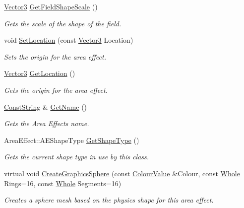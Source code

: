 \begin{DoxyCompactItemize}
\hyperlink{classphys_1_1Vector3}{Vector3} \hyperlink{classphys_1_1AreaEffect_a251d82e373c6ada5b80c023434e513f6}{GetFieldShapeScale} ()
\begin{DoxyCompactList}\small\item\em Gets the scale of the shape of the field. \item\end{DoxyCompactList}\item 
void \hyperlink{classphys_1_1AreaEffect_a9332d4f1c5d1eaa23c6db5e9b95d746e}{SetLocation} (const \hyperlink{classphys_1_1Vector3}{Vector3} Location)
\begin{DoxyCompactList}\small\item\em Sets the origin for the area effect. \item\end{DoxyCompactList}\item 
\hyperlink{classphys_1_1Vector3}{Vector3} \hyperlink{classphys_1_1AreaEffect_a76040dd90ff314ea6973dccf4e90ba37}{GetLocation} ()
\begin{DoxyCompactList}\small\item\em Gets the origin for the area effect. \item\end{DoxyCompactList}\item 
\hyperlink{namespacephys_a5ce5049f8b4bf88d6413c47b504ebb31}{ConstString} \& \hyperlink{classphys_1_1AreaEffect_a6395eeec0a3aec2385027cca35cf15cb}{GetName} ()
\begin{DoxyCompactList}\small\item\em Gets the Area Effects name. \item\end{DoxyCompactList}\item 
AreaEffect::AEShapeType \hyperlink{classphys_1_1AreaEffect_a13b613426c282222fec2b93dbbd9e7a8}{GetShapeType} ()
\begin{DoxyCompactList}\small\item\em Gets the current shape type in use by this class. \item\end{DoxyCompactList}\item 
virtual void \hyperlink{classphys_1_1AreaEffect_a6d1e8ddcea39fa441f02010af1970a16}{CreateGraphicsSphere} (const \hyperlink{classphys_1_1ColourValue}{ColourValue} \&Colour, const \hyperlink{namespacephys_a460f6bc24c8dd347b05e0366ae34f34a}{Whole} Rings=16, const \hyperlink{namespacephys_a460f6bc24c8dd347b05e0366ae34f34a}{Whole} Segments=16)
\begin{DoxyCompactList}\small\item\em Creates a sphere mesh based on the physics shape for this area effect. \item\end{DoxyCompactList}\item 

\end{DoxyCompactItemize}
